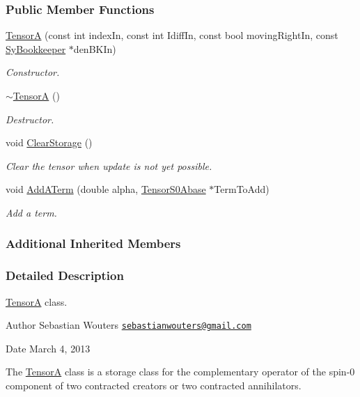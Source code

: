 \subsubsection*{Public Member Functions}
\begin{DoxyCompactItemize}
\item 
\hyperlink{classCheMPS2_1_1TensorA_a73e2f09fe1b1f4c4dbaae4053011d13b}{Tensor\-A} (const int index\-In, const int Idiff\-In, const bool moving\-Right\-In, const \hyperlink{classCheMPS2_1_1SyBookkeeper}{Sy\-Bookkeeper} $\ast$den\-B\-K\-In)
\begin{DoxyCompactList}\small\item\em Constructor. \end{DoxyCompactList}\item 
\hypertarget{classCheMPS2_1_1TensorA_a2b04b904fb5a059a6109818c0eccdbfb}{\hyperlink{classCheMPS2_1_1TensorA_a2b04b904fb5a059a6109818c0eccdbfb}{$\sim$\-Tensor\-A} ()}\label{classCheMPS2_1_1TensorA_a2b04b904fb5a059a6109818c0eccdbfb}

\begin{DoxyCompactList}\small\item\em Destructor. \end{DoxyCompactList}\item 
\hypertarget{classCheMPS2_1_1TensorA_ae7eb489c981ac455279a53e187953880}{void \hyperlink{classCheMPS2_1_1TensorA_ae7eb489c981ac455279a53e187953880}{Clear\-Storage} ()}\label{classCheMPS2_1_1TensorA_ae7eb489c981ac455279a53e187953880}

\begin{DoxyCompactList}\small\item\em Clear the tensor when update is not yet possible. \end{DoxyCompactList}\item 
void \hyperlink{classCheMPS2_1_1TensorA_aa007e07e253c3dc8ceaf5b9592cd7371}{Add\-A\-Term} (double alpha, \hyperlink{classCheMPS2_1_1TensorS0Abase}{Tensor\-S0\-Abase} $\ast$Term\-To\-Add)
\begin{DoxyCompactList}\small\item\em Add a term. \end{DoxyCompactList}\end{DoxyCompactItemize}
\subsubsection*{Additional Inherited Members}


\subsubsection{Detailed Description}
\hyperlink{classCheMPS2_1_1TensorA}{Tensor\-A} class. \begin{DoxyAuthor}{Author}
Sebastian Wouters \href{mailto:sebastianwouters@gmail.com}{\tt sebastianwouters@gmail.\-com} 
\end{DoxyAuthor}
\begin{DoxyDate}{Date}
March 4, 2013
\end{DoxyDate}
The \hyperlink{classCheMPS2_1_1TensorA}{Tensor\-A} class is a storage class for the complementary operator of the spin-\/0 component of two contracted creators or two contracted annihilators. 

